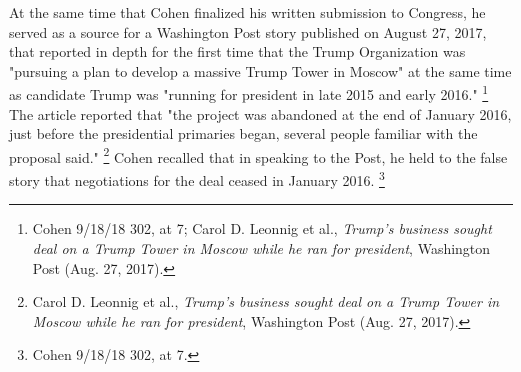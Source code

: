 At the same time that Cohen finalized his written submission to Congress, he served as a source for a Washington Post story published on August 27, 2017, that reported in depth for the first time that the Trump Organization was "pursuing a plan to develop a massive Trump Tower in Moscow" at the same time as candidate Trump was "running for president in late 2015 and early 2016."%
\footnote{Cohen 9/18/18 302, at 7;
Carol D. Leonnig et al., \textit{Trump's business sought deal on a Trump Tower in Moscow while he ran for president}, Washington Post (Aug. 27, 2017).}
The article reported that "the project was abandoned at the end of January 2016, just before the presidential primaries began, several people familiar with the proposal said."%
\footnote{Carol D. Leonnig et al., \textit{Trump's business sought deal on a Trump Tower in Moscow while he ran for president}, Washington Post (Aug. 27, 2017).}
Cohen recalled that in speaking to the Post, he held to the false story that negotiations for the deal ceased in January 2016.%
\footnote{Cohen 9/18/18 302, at 7.}


